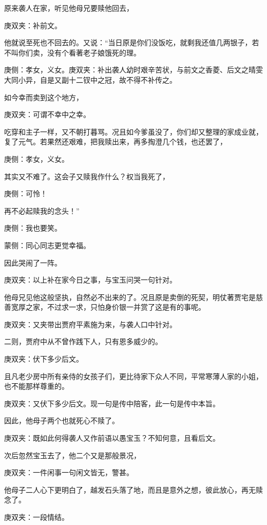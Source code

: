 \begin{parag}
    原来袭人在家，听见他母兄要赎他回去，\begin{note}庚双夹：补前文。\end{note}他就说至死也不回去的。又说：“当日原是你们没饭吃，就剩我还值几两银子，若不叫你们卖，没有个看著老子娘饿死的理。\begin{note}庚侧：孝女，义女。庚双夹：补出袭人幼时艰辛苦状，与前文之香菱、后文之晴雯大同小异，自是又副十二钗中之冠，故不得不补传之。\end{note}如今幸而卖到这个地方，\begin{note}庚双夹：可谓不幸中之幸。\end{note}吃穿和主子一样，又不朝打暮骂。况且如今爹虽没了，你们却又整理的家成业就，复了元气。若果然还艰难，把我赎出来，再多掏澄几个钱，也还罢了，\begin{note}庚侧：孝女，义女。\end{note}其实又不难了。这会子又赎我作什么？权当我死了，\begin{note}庚侧：可怜！\end{note}再不必起赎我的念头！”\begin{note}庚侧：我也要笑。\end{note}\begin{note}蒙侧：同心同志更觉幸福。\end{note}因此哭闹了一阵。\begin{note}庚双夹：以上补在家今日之事，与宝玉问哭一句针对。\end{note}
\end{parag}


\begin{parag}
    他母兄见他这般坚执，自然必不出来的了。况且原是卖倒的死契，明仗著贾宅是慈善宽厚之家，不过求一求，只怕身价银一并赏了这是有的事呢。\begin{note}庚双夹：又夹带出贾府平素施为来，与袭人口中针对。\end{note}二则，贾府中从不曾作践下人，只有恩多威少的。\begin{note}庚双夹：伏下多少后文。\end{note}且凡老少房中所有亲侍的女孩子们，更比待家下众人不同，平常寒薄人家的小姐，也不能那样尊重的。\begin{note}庚双夹：又伏下多少后文。现一句是传中陪客，此一句是传中本旨。\end{note}因此，他母子两个也就死心不赎了。\begin{note}庚双夹：既如此何得袭人又作前语以愚宝玉？不知何意，且看后文。\end{note}次后忽然宝玉去了，他二个又是那般景况，\begin{note}庚双夹：一件闲事一句闲文皆无，警甚。\end{note}他母子二人心下更明白了，越发石头落了地，而且是意外之想，彼此放心，再无赎念了。\begin{note}庚双夹：一段情结。\end{note}
\end{parag}


